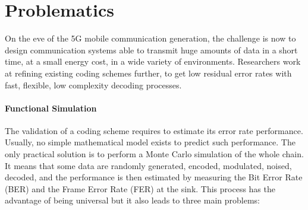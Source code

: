 \section{Problematics}

On the eve of the 5G mobile communication generation, the challenge is now to
design communication systems able to transmit huge amounts of data in a short
time, at a small energy cost, in a wide variety of environments. Researchers
work at refining existing coding schemes further, to get low residual error
rates with fast, flexible, low complexity decoding processes.

\paragraph{Functional Simulation}

The validation of a coding scheme requires to estimate its error rate
performance. Usually, no simple mathematical model exists to predict such
performance. The only practical solution is to perform a Monte Carlo simulation
of the whole chain. It means that some data are randomly generated, encoded,
modulated, noised, decoded, and the performance is then estimated by measuring
the Bit Error Rate (BER) and the Frame Error Rate (FER) at the sink. This
process has the advantage of being universal but it also leads to three main
problems:

